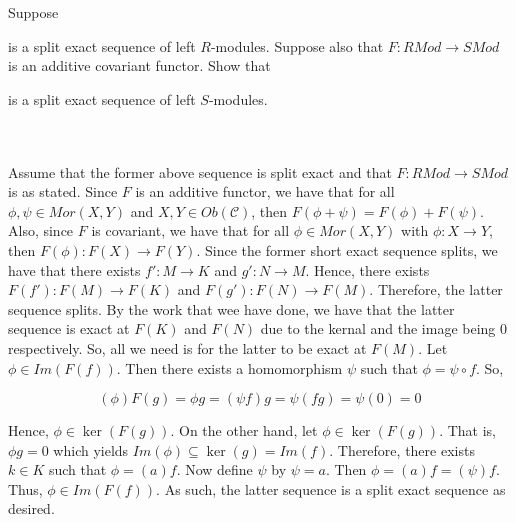 Suppose

\begin{center}
\end{center}

is a split exact sequence of left $R$-modules. Suppose also that $F:RMod\to SMod$ is an additive
covariant functor. Show that

\begin{center}
\end{center}

is a split exact sequence of left $S$-modules.\\\\

\begin{solution}\renewcommand{\qedsymbol}{}\ \\

     Assume that the former above sequence is split exact and that $F:RMod\to SMod$ is as stated. Since
     $F$ is an additive functor, we have that for all $\phi,\psi\in Mor(X,Y)$ and
     $X,Y\in Ob(\mathcal{C})$, then $F(\phi+\psi)=F(\phi)+F(\psi)$. Also, since $F$ is covariant, we
     have that for all $\phi\in Mor(X,Y)$ with $\phi:X\to Y$, then $F(\phi):F(X)\to F(Y)$. Since the
     former short exact sequence splits, we have that there exists $f':M\to K$ and $g':N\to M$. Hence,
     there exists $F(f'):F(M)\to F(K)$ and $F(g'): F(N)\to F(M)$. Therefore, the latter sequence splits.
     By the work that wee have done, we have that the latter sequence is exact at $F(K)$ and $F(N)$ due
     to the kernal and the image being $0$ respectively. So, all we need is for the latter to be exact
     at $F(M)$. Let $\phi\in Im(F(f))$. Then there exists a homomorphism $\psi$ such that
     $\phi=\psi\circ f$. So,
     
     $$(\phi)F(g)=\phi g=(\psi f)g=\psi(fg)=\psi(0)=0$$

     Hence, $\phi\in\ker(F(g))$. On the other hand, let $\phi\in\ker(F(g))$. That is, $\phi g=0$ which
     yields $Im(\phi)\subseteq\ker(g)=Im(f)$. Therefore, there exists $k\in K$ such that $\phi=(a)f$.
     Now define $\psi$ by $\psi=a$. Then $\phi=(a)f=(\psi)f$. Thus, $\phi\in Im(F(f))$. As such, the
     latter sequence is a split exact sequence as desired.

\end{solution}